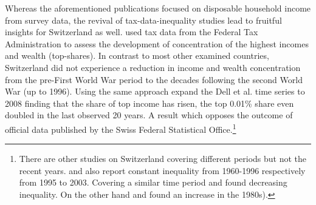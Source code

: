 \begin{Schunk}
\end{Schunk}

Whereas the aforementioned publications focused on disposable household income from survey data, the revival of tax-data-inequality studies lead to fruitful insights for Switzerland as well. \citet{dell_income_2007} used tax data from the Federal Tax Administration to assess the development of concentration of the highest incomes and wealth (top-shares). In contrast to most other examined countries, Switzerland did not experience a reduction in income and wealth concentration from the pre-First World War period to the decades following the second World War (up to 1996). Using the same approach \citet{foellmi_volatile_2013} expand the Dell et al. time series to 2008 finding that the share of top income has risen, the top 0.01\% share even doubled in the last observed 20 years. A result which opposes the outcome of official data published by the Swiss Federal Statistical Office.\footnote{There are other studies on Switzerland covering different periods but not the recent years. \citet{Flückiger et al. (2007) FEHLT} and also \citet{jeitziner_regionale_2007, jeitziner_regionale_2009} report constant inequality from 1960-1996 respectively from 1995 to 2003. Covering a similar time period \citet{bauer_verteilung_1994} and \citet{Bolzani and Abul Naga 2002 FEHLT oder es ist 2001} found decreasing inequality. On the other hand \citet{Buchmann and Sacchi (1995) FEHLT oder incomplete, siehe buchmann_zur_????} and \citet{Ernst et al. 2009 FEHLT} found an increase in the 1980s).} \\


